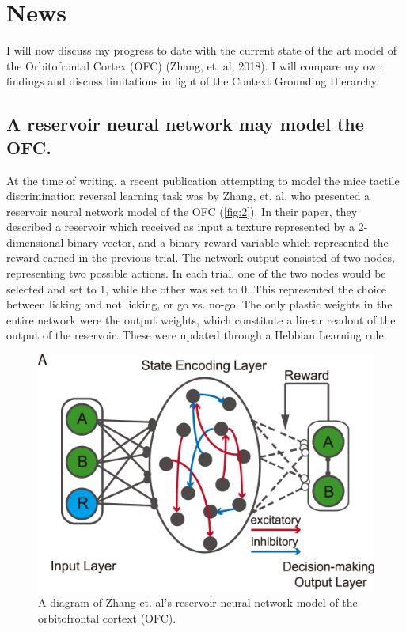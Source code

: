 \documentclass[11pt]{article}
\begin{document}
\section{News}
I will now discuss my progress to date with the current state of the art model of the Orbitofrontal Cortex (OFC) (Zhang, et. al, 2018).  I will compare my own findings and discuss limitations in light of the Context Grounding Hierarchy.

\subsection{A reservoir neural network may model the OFC.}
At the time of writing, a recent publication attempting to model the mice tactile discrimination reversal learning task was by Zhang, et. al, who presented a reservoir neural network model of the OFC (\autoref{fig:2}).  In their paper, they described a reservoir which received as input a texture represented by a 2-dimensional binary vector, and a binary reward variable which represented the reward earned in the previous trial.  The network output consisted of two nodes, representing two possible actions.  In each trial, one of the two nodes would be selected and set to 1, while the other was set to 0.  This represented the choice between licking and not licking, or go vs. no-go.  The only plastic weights in the entire network were the output weights, which constitute a linear readout of the output of the reservoir.  These were updated through a Hebbian Learning rule.

\begin{figure}
	\centering
	\includegraphics[scale=0.25]{./zhang_reservoir_architecture.PNG}
	\caption{A diagram of Zhang et. al's reservoir neural network model of the orbitofrontal cortext (OFC).}
	\label{fig:2}
\end{figure}
\end{document}
